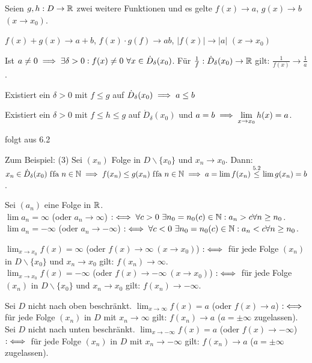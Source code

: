 \documentclass[a4paper,twoside,DIV15,BCOR12mm]{scrbook}
\begin{document}
\begin{satz}
Seien $g, h: D \to \mathbb{R}$ zwei weitere Funktionen und es gelte $f(x) \to a$, $g(x)\to b$ $(x\to x_0)$.
\begin{liste}
\item $f(x)+g(x) \to a+b$, $f(x)\cdot g(f) \to ab$, $|f(x)| \to |a|$ $(x\to x_0)$
\item Ist $a \ne 0 \implies \exists \delta>0: f(x)\ne 0 \ \forall x\in\dot D_\delta(x_0)$. Für $\frac{1}{f}: \dot D_\delta(x_0) \to \mathbb{R}$ gilt: $\frac{1}{f(x)} \to \frac{1}{a}$.
\item Existiert ein $\delta > 0 $ mit $f \le g$ auf $\dot D_\delta(x_0) \implies a \le b$
\item Existiert ein $\delta > 0$ mit $f \le h \le g$ auf $\dot D_\delta(x_0)$ und $a = b \implies \displaystyle\lim_{x\to x_0} h(x) = a$.
\end{liste}
\end{satz}

\begin{beweis}
folgt aus 6.2

Zum Beispiel: (3) Sei $(x_n)$ Folge in $D\backslash\{x_0\}$ und $x_n \to x_0$. Dann: $x_n \in \dot D_\delta(x_0) \text{ f\/fa } n\in\mathbb{N} \implies f(x_n) \le g(x_n) \text{ f\/fa } n\in\mathbb{N} \implies a = \lim f(x_n) \stackrel{\text{5.2}}{\le} \lim g(x_n) = b$.
\end{beweis}

\begin{definition}
\begin{liste}
\item Sei $(a_n)$ eine Folge in $\mathbb{R}$.\\
$\lim a_n = \infty$ (oder $a_n \to \infty$) $:\iff \forall c>0 \ \exists n_0 = n_0(c)\in\mathbb{N}: a_n > c \forall n\ge n_0$.\\ 
$\lim a_n = -\infty$ (oder $a_n \to -\infty$) $:\iff \forall c<0 \ \exists n_0 = n_0(c)\in\mathbb{N}: a_n < c \forall n\ge n_0$. 
\item $\displaystyle\lim_{x\to x_0} f(x) = \infty$ (oder $f(x) \to \infty\ (x\to x_0)$) $:\iff$ für jede Folge $(x_n)$ in $D\backslash\{x_0\}$  und $x_n \to x_0$ gilt: $f(x_n) \to \infty$. \\
$\displaystyle\lim_{x\to x_0} f(x) = -\infty$ (oder $f(x) \to -\infty\ (x\to x_0)$) $:\iff$ für jede Folge $(x_n)$ in $D\backslash\{x_0\}$  und $x_n \to x_0$ gilt: $f(x_n) \to -\infty$.
\item Sei $D$ nicht nach oben beschränkt. $\displaystyle\lim_{x\to \infty} f(x) = a$ (oder $f(x) \to a$) $:\iff$ für jede Folge $(x_n)$ in $D$ mit $x_n\to \infty$ gilt: $f(x_n) \to a$ ($a = \pm\infty$ zugelassen). \\
Sei $D$ nicht nach unten beschränkt. $\displaystyle\lim_{x\to -\infty} f(x) = a$ (oder $f(x) \to -\infty$) $:\iff$ für jede Folge $(x_n)$ in $D$ mit $x_n\to -\infty$ gilt: $f(x_n) \to a$ ($a = \pm\infty$ zugelassen). \\
\end{liste}
\end{definition}
\end{document}
